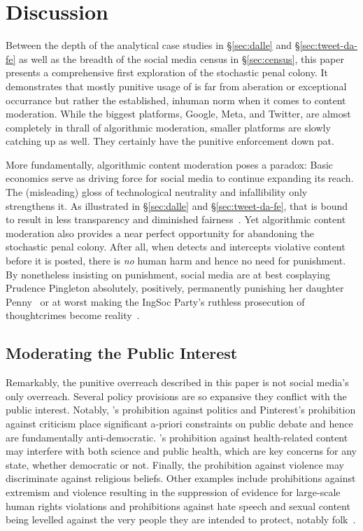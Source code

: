 \section{Discussion}
\label{sec:discussion}

Between the depth of the analytical case studies in \S\ref{sec:dalle} and
\S\ref{sec:tweet-da-fe} as well as the breadth of the social media census in
\S\ref{sec:census}, this paper presents a comprehensive first exploration of the
stochastic penal colony. It demonstrates that mostly punitive usage of  is
far from aberation or exceptional occurrance but rather the established, inhuman
norm when it comes to content moderation. While the biggest platforms, Google,
Meta, and Twitter, are almost completely in thrall of algorithmic moderation,
smaller platforms are slowly catching up as well. They certainly have the
punitive enforcement down pat.

More fundamentally, algorithmic content moderation poses a paradox: Basic
economics serve as driving force for social media to continue expanding its
reach. The (misleading) gloss of technological neutrality and infallibility only
strengthens it. As illustrated in \S\ref{sec:dalle} and \S\ref{sec:tweet-da-fe},
that is bound to result in less transparency and diminished
fairness~\cite{GorwaBinnsea2020}. Yet algorithmic content moderation also
provides a near perfect opportunity for abandoning the stochastic penal colony.
After all, when  detects and intercepts violative content before it is
posted, there is \emph{no} human harm and hence no need for punishment. By
nonetheless insisting on punishment, social media are at best cosplaying
Prudence Pingleton absolutely, positively, permanently punishing her daughter
Penny~\cite{Waters1988} or at worst making the IngSoc Party's ruthless
prosecution of thoughtcrimes become reality~\cite{Orwell1949}.


\subsection{Moderating the Public Interest}

Remarkably, the punitive overreach described in this paper is not social media's
only overreach. Several policy provisions are so expansive they conflict with
the public interest. Notably, \DALLE's prohibition against politics and
Pinterest's prohibition against criticism place significant a-priori constraints
on public debate and hence are fundamentally anti-democratic. \DALLE's
prohibition against health-related content may interfere with both science and
public health, which are key concerns for any state, whether democratic or not.
Finally, the prohibition against violence may discriminate against religious
beliefs. Other examples include prohibitions against extremism and violence
resulting in the suppression of evidence for large-scale human rights violations
and prohibitions against hate speech and sexual content being levelled against
the very people they are intended to protect, notably 
folk~\cite{EidelmanLeeea2021,RahmanAlJaloudAlKhatibea2019,Wille2020}.

